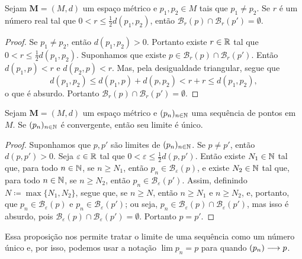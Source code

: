 \begin{prop}
	Sejam $\bm M = (M,d)$ um espaço métrico e $p_1,p_2 \in M$ tais que $p_1 \neq p_2$. Se $r$ é um número real tal que $0 < r \leq  \frac{1}{2}  d(p_1,p_2)$, então $\mathcal B_r(p) \cap \mathcal B_r(p') = \emptyset$.
\end{prop}
\begin{proof}
	Se $p_1 \neq p_2$, então $d(p_1,p_2) > 0$. Portanto existe $r \in \mathbb{R}$ tal que $0 < r \leq \frac{1}{2} d(p_1,p_2)$. Suponhamos que existe $p \in \mathcal B_r(p) \cap \mathcal B_r(p')$. Então $d(p_1,p)<r$ e $d(p_2,p)<r$. Mas, pela desigualdade triangular, segue que
	\begin{equation*}
	d(p_1,p_2) \leq d(p_1,p) + d(p,p_2) < r + r \leq d(p_1,p_2),
	\end{equation*}
o que é absurdo. Portanto $\mathcal B_r(p) \cap \mathcal B_r(p') = \emptyset$.
\end{proof}

\begin{prop}
	Sejam $\bm M = (M,d)$ um espaço métrico e $(p_n)_{n \in \mathbb{N}}$ uma sequência de pontos em $M$. Se $(p_n)_{n \in \mathbb{N}}$ é convergente, então seu limite é único.
\end{prop}
\begin{proof}
	Suponhamos que $p,p'$ são limites de $(p_n)_{n \in \mathbb{N}}$. Se $p \neq p'$, então $d(p,p')>0$. Seja $\varepsilon \in \mathbb{R}$ tal que $0 < \varepsilon \leq \frac{1}{2} d(p,p')$. Então existe $N_1 \in \mathbb{N}$ tal que, para todo $n \in \mathbb{N}$, se $n \geq N_1$, então $p_n \in \mathcal B_\varepsilon(p)$, e existe $N_2 \in \mathbb{N}$ tal que, para todo $n \in \mathbb{N}$, se $n \geq N_2$, então $p_n \in \mathcal B_\varepsilon(p')$. Assim, definindo $N \coloneqq \max \{N_1,N_2\}$, segue que, se $n \geq N$, então $n \geq N_1$ e $n \geq N_2$, e, portanto, que $p_n \in \mathcal B_\varepsilon(p)$ e $p_n \in \mathcal B_\varepsilon(p')$; ou seja, $p_n \in \mathcal B_\varepsilon(p) \cap \mathcal B_\varepsilon(p')$, mas isso é absurdo, pois $\mathcal B_\varepsilon(p) \cap \mathcal B_\varepsilon(p')=\emptyset$. Portanto $p=p'$.
\end{proof}

	Essa proposição nos permite tratar o limite de uma sequência como um número único e, por isso, podemos usar a notação $\lim p_n = p$ para quando $(p_n) \longrightarrow p$.

